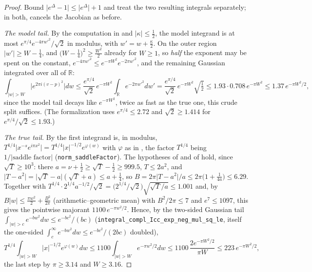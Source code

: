 \begin{proof}
\leanok
{}
Bound $\lvert e^{\Delta}-1\rvert\le\lvert e^{\Delta}\rvert+1$ and treat the two resulting
integrals separately; in both,  cancels the Jacobian as before.

\emph{The model tail.}  By the computation in  and
$\lvert\kappa\rvert\le\tfrac12$, the model integrand is at most
$e^{\pi/4}e^{-4\pi w'^{2}}/\sqrt2$ in modulus, with $w'=w+\tfrac\kappa2$.  On the outer region
$\lvert w'\rvert\ge W-\tfrac14$, and $\bigl(W-\tfrac14\bigr)^{2}\ge\tfrac{W^{2}}2$ already for
$W\ge1$, so \emph{half} the exponent may be spent on the constant,
$e^{-4\pi w'^{2}}\le e^{-\pi W^{2}}e^{-2\pi w'^{2}}$, and the remaining Gaussian integrated over
all of $\mathbb{R}$:
\[
  \int_{\lvert w\rvert>W}\bigl\lvert e^{2\pi i(v-p)^{2}}\bigr\rvert dw
  \le\frac{e^{\pi/4}}{\sqrt2}\,e^{-\pi W^{2}}\int_{\mathbb{R}}e^{-2\pi w'^{2}}dw'
  =\frac{e^{\pi/4}}{\sqrt2}\,e^{-\pi W^{2}}\sqrt{\tfrac12}
  \le1.93\cdot0.708\,e^{-\pi W^{2}}\le1.37\,e^{-\pi W^{2}/2},
\]
since the model tail decays like $e^{-\pi W^{2}}$, twice as fast as the true one, this crude
split suffices.  (The formalization uses $e^{\pi/4}\le2.72$ and
$\sqrt2\ge1.414$ for $e^{\pi/4}/\sqrt2\le1.93$.)

\emph{The true tail.}  By  the first integrand is, in modulus,
$T^{1/4}\bigl\lvert x^{-s}e^{i\pi x^{2}}\bigr\rvert=T^{1/4}\lvert x\rvert^{-1/2}e^{\varphi(w)}$
with $\varphi$ as in , the factor $T^{1/4}$ being $1/\lvert
\text{saddle factor}\rvert$ (\texttt{norm\_saddleFactor}).  The hypotheses of  and
of  hold, since $\sqrt T\ge10^{3}$: there $a=\nu+\tfrac12\ge
\sqrt T-\tfrac12\ge999.5$, $T\le2a^{2}$, and $\lvert T-a^{2}\rvert=\lvert\sqrt T-a\rvert
(\sqrt T+a)\le a+\tfrac14$, so $B=2\pi\lvert T-a^{2}\rvert/a\le2\pi\bigl(1+\tfrac1{4a}\bigr)
\le6.29$.  Together with $T^{1/4}\cdot2^{1/4}a^{-1/2}/\sqrt2=\bigl(2^{1/4}/\sqrt2\bigr)
\sqrt{\sqrt T/a}\le1.001$ and, by $B\lvert w\rvert\le\tfrac{\pi w^{2}}2+\tfrac{B^{2}}{2\pi}$
(arithmetic--geometric mean) with $B^{2}/2\pi\le7$ and $e^{7}\le1097$, this gives the pointwise
majorant $1100\,e^{-\pi w^{2}/2}$.  Hence, by the two-sided Gaussian tail
$\int_{\lvert w\rvert>c}e^{-bw^{2}}dw\le e^{-bc^{2}}/(bc)$ (\texttt{integral\_compl\_Icc\_exp\_neg\_mul\_sq\_le},
itself the one-sided $\int_{c}^{\infty}e^{-bw^{2}}dw\le e^{-bc^{2}}/(2bc)$ doubled),
\[
  T^{1/4}\int_{\lvert w\rvert>W}\lvert x\rvert^{-1/2}e^{\varphi(w)}dw
  \le1100\int_{\lvert w\rvert>W}e^{-\pi w^{2}/2}dw
  \le1100\,\frac{2e^{-\pi W^{2}/2}}{\pi W}\le223\,e^{-\pi W^{2}/2},
\]
the last step by $\pi\ge3.14$ and $W\ge3.16$.


\end{proof}
